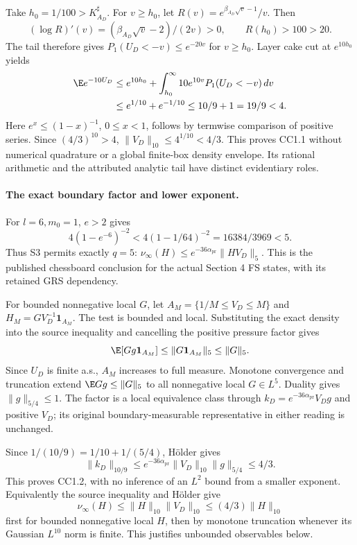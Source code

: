 Take $h_0=1/100>K^\sharp_{A_D}$. For $v\ge h_0$, let
$R(v)=e^{\beta_{A_D}\sqrt v-1}/v$. Then
\[
 (\log R)'(v)=(\beta_{A_D}\sqrt v-2)/(2v)>0,\qquad R(h_0)>100>20.
\]
The tail therefore gives $P_1(U_D<-v)\le e^{-20v}$ for $v\ge h_0$.
Layer cake cut at $e^{10h_0}$ yields
\begin{align*}
 \E e^{-10U_D}
 &\le e^{10h_0}+\int_{h_0}^{\infty}10e^{10v}P_1(U_D<-v)\,dv\\
 &\le e^{1/10}+e^{-1/10}\le10/9+1=19/9<4 .
\end{align*}
Here $e^x\le(1-x)^{-1}$, $0\le x<1$, follows by termwise comparison of
positive series. Since $(4/3)^{10}>4$,
$\|V_D\|_{10}\le4^{1/10}<4/3$. This proves CC1.1 without numerical
quadrature or a global finite-box density envelope. Its rational arithmetic
and the attributed analytic tail have distinct evidentiary roles.

\paragraph{The exact boundary factor and lower exponent.}
For $l=6,m_0=1$, $e>2$ gives
\[
 4(1-e^{-6})^{-2}<4(1-1/64)^{-2}=16384/3969<5.
\]
Thus S3 permits exactly $q=5$:
$\nu_\infty(H)\le e^{-36\alpha_{\mathrm{pr}}}\|HV_D\|_5$.
This is the published chessboard conclusion for the actual Section 4 FS
states, with its retained GRS dependency.

For bounded nonnegative local $G$, let
$A_M=\{1/M\le V_D\le M\}$ and $H_M=GV_D^{-1}\mathbf1_{A_M}$.
The test is bounded and local. Substituting the exact density into the source
inequality and cancelling the positive pressure factor gives
\[
 \E[Gg\mathbf1_{A_M}]\le\|G\mathbf1_{A_M}\|_5\le\|G\|_5.
\]
Since $U_D$ is finite a.s., $A_M$ increases to full measure. Monotone
convergence and truncation extend $\E Gg\le\|G\|_5$ to all nonnegative
local $G\in L^5$. Duality gives $\|g\|_{5/4}\le1$. The factor is a local
equivalence class through $k_D=e^{-36\alpha_{\mathrm{pr}}}V_Dg$ and positive
$V_D$; its original boundary-measurable representative in either reading
is unchanged.

Since $1/(10/9)=1/10+1/(5/4)$, H\"older gives
\[
 \|k_D\|_{10/9}\le e^{-36\alpha_{\mathrm{pr}}}\|V_D\|_{10}\|g\|_{5/4}
 \le4/3.
\]
This proves CC1.2, with no inference of an $L^2$ bound from a smaller
exponent. Equivalently the source inequality and H\"older give
\[
 \nu_\infty(H)\le\|H\|_{10}\|V_D\|_{10}\le(4/3)\|H\|_{10}
\]
first for bounded nonnegative local $H$, then by monotone truncation
whenever its Gaussian $L^{10}$ norm is finite. This justifies unbounded
observables below.

